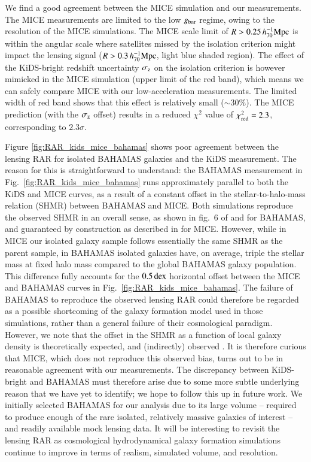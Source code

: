 \documentclass{aa}
\newcommand{\hMpc}{\,h_{70}^{-1}{\rm{Mpc}} }
\newcommand{\dex}{\,{\rm dex}}
\newcommand{\un}[1]{_{\rm #1}}
\begin{document}
We find a good agreement between the MICE simulation and our measurements. The MICE measurements are limited to the low $g\un{bar}$ regime, owing to the resolution of the MICE simulations. The MICE scale limit of $R > 0.25 \hMpc$ is within the angular scale where satellites missed by the isolation criterion might impact the lensing signal ($R > 0.3 \hMpc$, light blue shaded region). The effect of the KiDS-bright redshift uncertainty $\sigma\un{z}$ on the isolation criterion is however mimicked in the MICE simulation (upper limit of the red band), which means we can safely compare MICE with our low-acceleration measurements. The limited width of red band shows that this effect is relatively small ($\sim 30\%$). The MICE prediction (with the $\sigma\un{z}$ offset) results in a reduced $\chi^2$ value of $\chi\un{red}^2 = 2.3$, corresponding to $2.3 \sigma$.

Figure \ref{fig:RAR_kids_mice_bahamas} shows poor agreement between the lensing RAR for isolated BAHAMAS galaxies and the KiDS measurement. The reason for this is straightforward to understand: the BAHAMAS measurement in Fig.~\ref{fig:RAR_kids_mice_bahamas} runs approximately parallel to both the KiDS and MICE curves, as a result of a constant offset in the stellar-to-halo-mass relation (SHMR) between BAHAMAS and MICE. Both simulations reproduce the observed SHMR in an overall sense, as shown in fig.~6 of \citet{mccarthy2017} and \citet{jakobs2018} for BAHAMAS, and guaranteed by construction as described in \citet{carretero2015} for MICE. However, while in MICE our isolated galaxy sample follows essentially the same SHMR as the parent sample, in BAHAMAS isolated galaxies have, on average, triple the stellar mass at fixed halo mass compared to the global BAHAMAS galaxy population. This difference fully accounts for the $0.5 \dex$ horizontal offset between the MICE and BAHAMAS curves in Fig.~\ref{fig:RAR_kids_mice_bahamas}. The failure of BAHAMAS to reproduce the observed lensing RAR could therefore be regarded as a possible shortcoming of the galaxy formation model used in those simulations, rather than a general failure of their cosmological paradigm. However, we note that the offset in the SHMR as a function of local galaxy density is theoretically expected, and (indirectly) observed \cite[e.g.][]{dutton2010,correa2020}. It is therefore curious that MICE, which does not reproduce this observed bias, turns out to be in reasonable agreement with our measurements. The discrepancy between KiDS-bright and BAHAMAS must therefore arise due to some more subtle underlying reason that we have yet to identify; we hope to follow this up in future work. We initially selected BAHAMAS for our analysis due to its large volume -- required to produce enough of the rare isolated, relatively massive galaxies of interest -- and readily available mock lensing data. It will be interesting to revisit the lensing RAR as cosmological hydrodynamical galaxy formation simulations continue to improve in terms of realism, simulated volume, and resolution.
\end{document}
